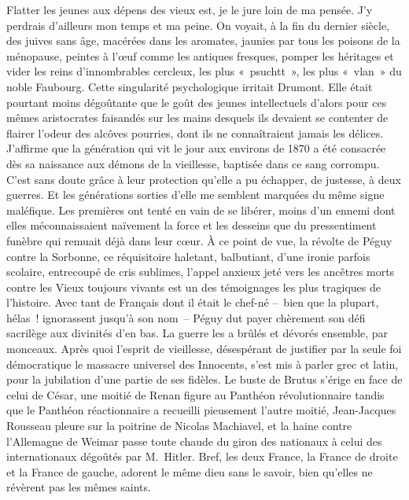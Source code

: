 \documentclass[french,twoside]{book} %
\begin{document}
Flatter les jeunes aux dépens des vieux est, je le jure loin de ma pensée. J’y perdrais d’ailleurs mon temps et ma peine. On voyait, à la fin du dernier siècle, des juives sans âge, macérées dans les aromates, jaunies par tous les poisons de la ménopause, peintes à l’œuf comme les antiques fresques, pomper les héritages et vider les reins d’innombrables cercleux, les plus « psuchtt », les plus « vlan » du noble Faubourg. Cette singularité psychologique irritait Drumont. Elle était pourtant moins dégoûtante que le goût des jeunes intellectuels d’alors pour ces mêmes aristocrates faisandés sur les mains desquels ils devaient se contenter de flairer l’odeur des alcôves pourries, dont ils ne connaîtraient jamais les délices. J’affirme que la génération qui vit le jour aux environs de 1870 a été consacrée dès sa naissance aux démons de la vieillesse, baptisée dans ce sang corrompu. C’est sans doute grâce à leur protection qu’elle a pu échapper, de justesse, à deux guerres. Et les générations sorties d’elle me semblent marquées du même signe maléfique. Les premières ont tenté en vain de se libérer, moins d’un ennemi dont elles méconnaissaient naïvement la force et les desseins que du pressentiment funèbre qui remuait déjà dans leur cœur. À ce point de vue, la révolte de Péguy contre la Sorbonne, ce réquisitoire haletant, balbutiant, d’une ironie parfois scolaire, entrecoupé de cris sublimes, l’appel anxieux jeté vers les ancêtres morts contre les Vieux toujours vivants est un des témoignages les plus tragiques de l’histoire. Avec tant de Français dont il était le chef-né – bien que la plupart, hélas ! ignorassent jusqu’à son nom – Péguy dut payer chèrement son défi sacrilège aux divinités d’en bas. La guerre les a brûlés et dévorés ensemble, par monceaux. Après quoi l’esprit de vieillesse, désespérant de justifier par la seule foi démocratique le massacre universel des Innocents, s’est mis à parler grec et latin, pour la jubilation d’une partie de ses fidèles. Le buste de Brutus s’érige en face de celui de César, une moitié de Renan figure au Panthéon révolutionnaire tandis que le Panthéon réactionnaire a recueilli pieusement l’autre moitié, Jean-Jacques Rousseau pleure sur la poitrine de Nicolas Machiavel, et la haine contre l’Allemagne de Weimar passe toute chaude du giron des nationaux à celui des internationaux dégoûtés par M. Hitler. Bref, les deux France, la France de droite et la France de gauche, adorent le même dieu sans le savoir, bien qu’elles ne révèrent pas les mêmes saints.\par
 \par
\end{document}
